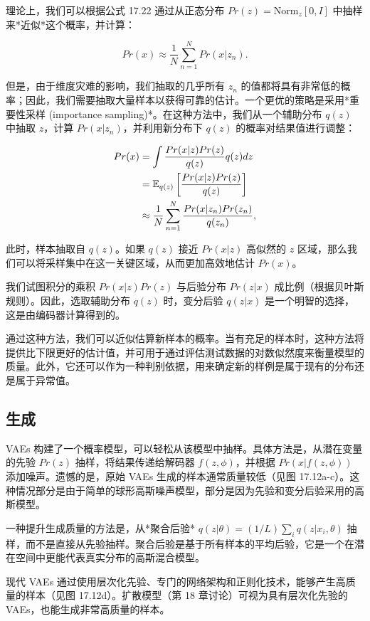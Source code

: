 理论上，我们可以根据公式 17.22 通过从正态分布 \(Pr(z) = \text{Norm}_z[0,I]\) 中抽样来*近似*这个概率，并计算：

\begin{equation}
Pr(x) \approx \frac{1}{N} \sum_{n=1}^{N} Pr(x|z_n). 
\end{equation}

但是，由于维度灾难的影响，我们抽取的几乎所有 \(z_n\) 的值都将具有非常低的概率；因此，我们需要抽取大量样本以获得可靠的估计。一个更优的策略是采用*重要性采样 (importance sampling)*。在这种方法中，我们从一个辅助分布 \(q(z)\) 中抽取 \(z\)，计算 \(Pr(x|z_n)\)，并利用新分布下 \(q(z)\) 的概率对结果值进行调整：


\begin{align}
Pr(x) &= \int \frac{Pr(x|z)Pr(z)}{q(z)}q(z)dz \notag \\
&= \mathbb{E}_{q(z)} \left[\frac{Pr(x|z)Pr(z)}{q(z)}\right] \notag \\
&\approx \frac{1}{N} \sum_{n=1}^{N} \frac{Pr(x|z_n)Pr(z_n)}{q(z_n)}, 
\end{align} 


此时，样本抽取自 \(q(z)\)。如果 \(q(z)\) 接近 \(Pr(x|z)\) 高似然的 \(z\) 区域，那么我们可以将采样集中在这一关键区域，从而更加高效地估计 \(Pr(x)\)。

我们试图积分的乘积 \(Pr(x|z)Pr(z)\) 与后验分布 \(Pr(z|x)\) 成比例（根据贝叶斯规则）。因此，选取辅助分布 \(q(z)\) 时，变分后验 \(q(z|x)\) 是一个明智的选择，这是由编码器计算得到的。

通过这种方法，我们可以近似估算新样本的概率。当有充足的样本时，这种方法将提供比下限更好的估计值，并可用于通过评估测试数据的对数似然度来衡量模型的质量。此外，它还可以作为一种判别依据，用来确定新的样例是属于现有的分布还是属于异常值。

\subsection{生成}
VAEs 构建了一个概率模型，可以轻松从该模型中抽样。具体方法是，从潜在变量的先验 \(Pr(z)\) 抽样，将结果传递给解码器 \(f(z, \phi)\)，并根据 \(Pr(x|f(z, \phi))\) 添加噪声。遗憾的是，原始 VAEs 生成的样本通常质量较低（见图 17.12a-c）。这种情况部分是由于简单的球形高斯噪声模型，部分是因为先验和变分后验采用的高斯模型。

一种提升生成质量的方法是，从*聚合后验* \(q(z|\theta) = (1/L) \sum_{i} q(z|x_i, \theta)\) 抽样，而不是直接从先验抽样。聚合后验是基于所有样本的平均后验，它是一个在潜在空间中更能代表真实分布的高斯混合模型。

现代 VAEs 通过使用层次化先验、专门的网络架构和正则化技术，能够产生高质量的样本（见图 17.12d）。扩散模型（第 18 章讨论）可视为具有层次化先验的 VAEs，也能生成非常高质量的样本。

